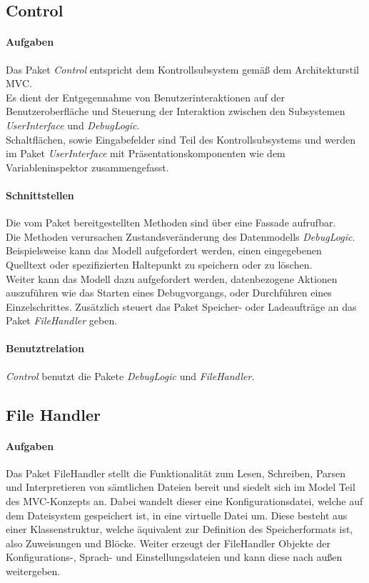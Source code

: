 \documentclass[parskip=full]{scrartcl}
\begin{document}
\subsection{Control}
\paragraph{Aufgaben}
    Das Paket \textit{Control} entspricht dem Kontrollsubsystem gemäß dem Architekturstil MVC.\\
    Es dient der Entgegennahme von Benutzerinteraktionen auf der Benutzeroberfläche und Steuerung der Interaktion zwischen den
    Subsystemen \textit{UserInterface} und \textit{DebugLogic}.\\
    Schaltflächen, sowie Eingabefelder sind Teil des Kontrollsubsystems und werden im Paket 
    \textit{UserInterface} mit Präsentationskomponenten wie dem Variableninspektor zusammengefasst.\\
\paragraph{Schnittstellen}
    Die vom Paket bereitgestellten Methoden sind über eine Fassade aufrufbar.\\
    Die Methoden verursachen Zustandsveränderung des Datenmodells \textit{DebugLogic}.\\
    Beispielsweise kann das Modell aufgefordert werden, einen eingegebenen Quelltext oder spezifizierten Haltepunkt
    zu speichern oder zu löschen.\\
    Weiter kann das Modell dazu aufgefordert werden, datenbezogene Aktionen auszuführen wie
    das Starten eines Debugvorgangs, oder Durchführen eines Einzelschrittes. Zusätzlich steuert das Paket Speicher- oder Ladeaufträge an das Paket \textit{FileHandler} geben. 
\paragraph{Benutztrelation}
    \textit{Control} benutzt die Pakete \textit{DebugLogic} und \textit{FileHandler}.%

\subsection{File Handler}
\paragraph{Aufgaben}
Das Paket FileHandler stellt die Funktionalität zum Lesen, Schreiben, Parsen und Interpretieren von sämtlichen Dateien bereit und siedelt sich im Model Teil des MVC-Konzepts an.
Dabei wandelt dieser eine Konfigurationsdatei, welche auf dem Dateisystem gespeichert ist, in eine virtuelle Datei um.
Diese besteht aus einer Klassenstruktur, welche äquivalent zur Definition des Speicherformats ist, also Zuweisungen und Blöcke.
Weiter erzeugt der FileHandler Objekte der Konfigurations-, Sprach- und Einstellungsdateien und kann diese nach außen weitergeben.
\end{document}
